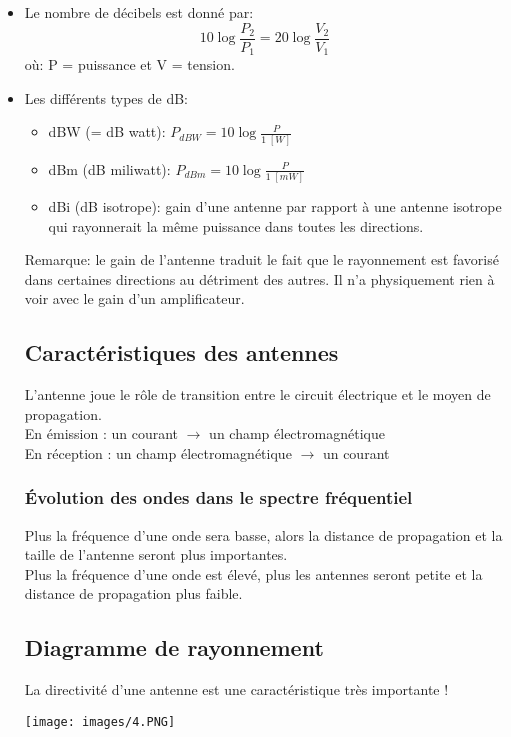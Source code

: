 \documentclass[a4paper]{article}
\begin{document}
\begin{itemize}

\item Le nombre de décibels est donné par:
\[ 10 \log \frac{P_2}{P_1} = 20 \log \frac{V_2}{V_1} \]
où: P = puissance et V = tension.


\item Les différents types de dB:
\begin{itemize}
    \item dBW (= dB watt): $\displaystyle P_{dBW} = 10 \log \frac{P}{1 \; [W]} $
    \item dBm (dB miliwatt): $\displaystyle P_{dBm} = 10 \log \frac{P}{1 \; [mW]} $
    \item dBi (dB isotrope): gain d'une antenne par rapport à une antenne isotrope qui rayonnerait la même puissance dans toutes les directions.
\end{itemize}
Remarque: le gain de l'antenne traduit le fait que le rayonnement est favorisé dans certaines directions au détriment des autres. Il n'a physiquement rien à voir avec le gain d'un amplificateur.

\subsection{Caractéristiques des antennes}
L'antenne joue le rôle de transition entre le circuit électrique et le moyen de propagation.\\
En émission : un courant $\rightarrow$ un champ électromagnétique\\
En réception : un champ électromagnétique $\rightarrow$ un courant\\
\subsubsection{Évolution des ondes dans le spectre fréquentiel}
Plus la fréquence d'une onde sera basse, alors la distance de propagation et la taille de l'antenne seront plus importantes.\\
Plus la fréquence d'une onde est élevé, plus les antennes seront petite et la distance de propagation plus faible.

\subsection{Diagramme de rayonnement}
La directivité d'une antenne est une caractéristique très importante !
\begin{center}
   \texttt{[image: images/4.PNG]} 
\end{center}


\end{itemize}
\end{document}
